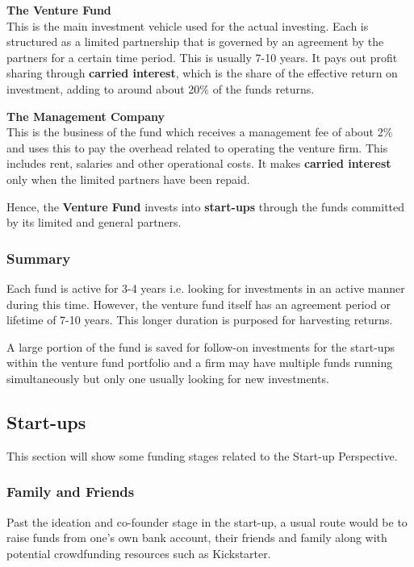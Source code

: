 \documentclass[a4paper]{article}
\begin{document}
{\vspace{5pt}
\noindent \textbf{The Venture Fund}\\
This is the main investment vehicle used for the actual investing. Each is structured as a limited partnership that is governed by an agreement by the partners for a certain time period. This is usually 7-10 years. It pays out profit sharing through \textbf{carried interest}, which is the share of the effective return on investment, adding to around about 20\% of the funds returns.

\vspace{5pt}
\noindent \textbf{The Management Company}\\
This is the business of the fund which receives a management fee of about 2\% and uses this to pay the overhead related to operating the venture firm. This includes rent, salaries and other operational costs. It makes \textbf{carried interest} only when the limited partners have been repaid.

\vspace{5pt}
\noindent Hence, the \textbf{Venture Fund} invests into \textbf{start-ups} through the funds committed by its limited and general partners.

\subsubsection{Summary}
Each fund is active for 3-4 years i.e. looking for investments in an active manner during this time. However, the venture fund itself has an agreement period or lifetime of 7-10 years. This longer duration is purposed for harvesting returns.

\vspace{5pt}
\noindent A large portion of the fund is saved for follow-on investments for the start-ups within the venture fund portfolio and a firm may have multiple funds running simultaneously but only one usually looking for new investments. 

\subsection{Start-ups}
This section will show some funding stages related to the Start-up Perspective.

\subsubsection{Family and Friends}
Past the ideation and co-founder stage in the start-up, a usual route would be to raise funds from one's own bank account, their friends and family along with potential crowdfunding resources such as Kickstarter.

}
\end{document}
